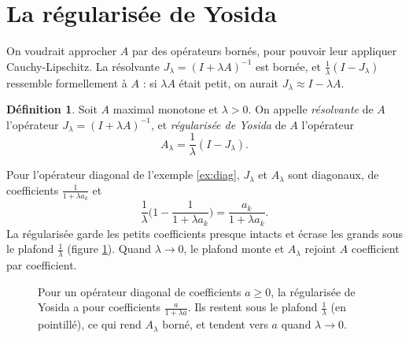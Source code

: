 \documentclass[11pt,a4paper]{article}
\theoremstyle{plain}
\theoremstyle{definition}
\newtheorem{definition}[theoreme]{Définition}
\theoremstyle{remark}
\begin{document}
\section{La régularisée de Yosida}

On voudrait approcher $A$ par des opérateurs bornés, pour pouvoir leur appliquer Cauchy-Lipschitz. La résolvante $J_\lambda=(I+\lambda A)^{-1}$ est bornée, et $\frac1\lambda(I-J_\lambda)$ ressemble formellement à $A$ : si $\lambda A$ était petit, on aurait $J_\lambda\approx I-\lambda A$.

\begin{definition}
Soit $A$ maximal monotone et $\lambda>0$. On appelle \emph{résolvante} de $A$ l'opérateur $J_\lambda=(I+\lambda A)^{-1}$, et \emph{régularisée de Yosida} de $A$ l'opérateur
\[
  A_\lambda=\frac1\lambda(I-J_\lambda) .
\]
\end{definition}

Pour l'opérateur diagonal de l'exemple \ref{ex:diag}, $J_\lambda$ et $A_\lambda$ sont diagonaux, de coefficients $\frac1{1+\lambda a_k}$ et
\[
  \frac1\lambda\Big(1-\frac1{1+\lambda a_k}\Big)=\frac{a_k}{1+\lambda a_k} .
\]
La régularisée garde les petits coefficients presque intacts et écrase les grands sous le plafond $\frac1\lambda$ (figure \ref{fig:yosida}). Quand $\lambda\to0$, le plafond monte et $A_\lambda$ rejoint $A$ coefficient par coefficient.

\begin{figure}[h]
\centering
{}
\caption{Pour un opérateur diagonal de coefficients $a\geq0$, la régularisée de Yosida a pour coefficients $\frac{a}{1+\lambda a}$. Ils restent sous le plafond $\frac1\lambda$ (en pointillé), ce qui rend $A_\lambda$ borné, et tendent vers $a$ quand $\lambda\to0$.}\label{fig:yosida}
\end{figure}
\end{document}
